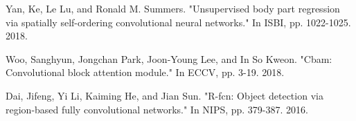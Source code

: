 \documentclass[runningheads]{llncs}
\begin{document}
\begin{thebibliography}{8}
Yan, Ke, Le Lu, and Ronald M. Summers. "Unsupervised body part regression via spatially self-ordering convolutional neural networks." In ISBI, pp. 1022-1025. 2018.

Woo, Sanghyun, Jongchan Park, Joon-Young Lee, and In So Kweon. "Cbam: Convolutional block attention module." In ECCV, pp. 3-19. 2018.



Dai, Jifeng, Yi Li, Kaiming He, and Jian Sun. "R-fcn: Object detection via region-based fully convolutional networks." In NIPS, pp. 379-387. 2016.

\end{thebibliography}
\end{document}
